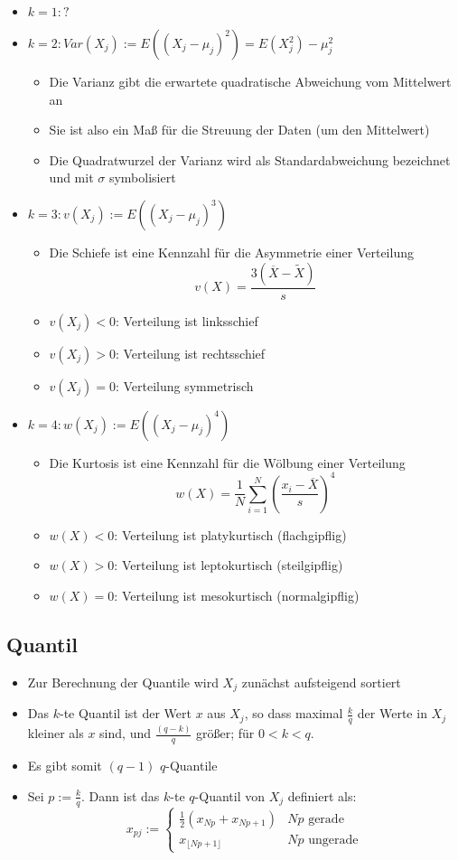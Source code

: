\documentclass{scrartcl}
\begin{document}
\begin{itemize}
	\item $ k=1:? $
	\item $ k=2:Var(X_j) := E((X_j - \mu_j)^2) = E(X_j^2) - \mu_j^2 $
	\[  \]
	\begin{itemize}
		\item Die Varianz gibt die erwartete quadratische Abweichung vom 
		Mittelwert an
		\item Sie ist also ein Maß für die Streuung der Daten (um den 
		Mittelwert)
		\item Die Quadratwurzel der Varianz wird als Standardabweichung 
		bezeichnet und mit $ \sigma $ symbolisiert
	\end{itemize}
	\item $ k=3:v(X_j) := E((X_j - \mu_j)^3) $
	\begin{itemize}
		\item Die Schiefe ist eine Kennzahl für die Asymmetrie einer Verteilung
		\[ v(X) = \frac{3(\overline{X} - \tilde{X})}{s} \]
		\item $ v(X_j) < 0 $: Verteilung ist linksschief
		\item $ v(X_j) > 0 $: Verteilung ist rechtsschief
		\item $ v(X_j) = 0 $: Verteilung symmetrisch
	\end{itemize}
	\item $ k=4:w(X_j) := E((X_j - \mu_j)^4) $
	\begin{itemize}
		\item Die Kurtosis ist eine Kennzahl für die Wölbung einer Verteilung
		\[ w(X) = \frac{1}{N} \sum_{i=1}^{N} (\frac{x_i - \overline{X}}{s})^4 \]
		\item $ w(X) < 0 $: Verteilung ist platykurtisch (flachgipflig)
		\item $ w(X) > 0 $: Verteilung ist leptokurtisch (steilgipflig)
		\item $ w(X) = 0 $: Verteilung ist mesokurtisch (normalgipflig)
	\end{itemize}
\end{itemize}

\subsection{Quantil}

\begin{itemize}
	\item Zur Berechnung der Quantile wird $ X_j $ zunächst aufsteigend sortiert
	\item Das $ k $-te Quantil ist der Wert $ x $ aus $ X_j $, so dass maximal 
	$ \frac{k}{q} $ der Werte in $ X_j $ kleiner als $ x $ sind, und $ 
	\frac{(q-k)}{q} $ größer; für $ 0<k<q $.
	\item Es gibt somit $ (q-1) $ $ q $-Quantile
	\item Sei $ p := \frac{k}{q} $. Dann ist das $ k $-te $ q $-Quantil von $ 
	X_j $ definiert als:
	\[ x_{pj} := \begin{cases}
		\frac{1}{2} (x_{Np} + x_{Np+1}) & Np \text{ gerade} \\
		x_{\lfloor Np+1 \rfloor} & Np \text{ ungerade}
	\end{cases} \]
\end{itemize}
\end{document}
